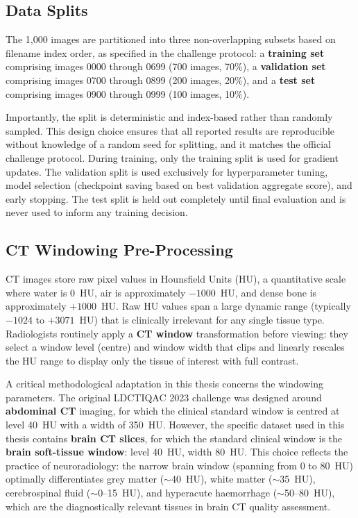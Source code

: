 \subsection{Data Splits}

The 1,000 images are partitioned into three non-overlapping subsets based on filename
index order, as specified in the challenge protocol: a \textbf{training set} comprising
images 0000 through 0699 (700 images, 70\%), a \textbf{validation set} comprising images
0700 through 0899 (200 images, 20\%), and a \textbf{test set} comprising images 0900
through 0999 (100 images, 10\%).

Importantly, the split is deterministic and index-based rather than randomly sampled.
This design choice ensures that all reported results are reproducible without knowledge
of a random seed for splitting, and it matches the official challenge protocol. During
training, only the training split is used for gradient updates. The validation split is
used exclusively for hyperparameter tuning, model selection (checkpoint saving based on
best validation aggregate score), and early stopping. The test split is held out
completely until final evaluation and is never used to inform any training decision.

\subsection{CT Windowing Pre-Processing}
\label{subsec:windowing}

CT images store raw pixel values in Hounsfield Units (HU), a quantitative scale where
water is 0~HU, air is approximately $-1000$~HU, and dense bone is approximately
$+1000$~HU. Raw HU values span a large dynamic range (typically $-1024$ to $+3071$~HU)
that is clinically irrelevant for any single tissue type. Radiologists routinely apply a
\textbf{CT window} transformation before viewing: they select a window level (centre)
and window width that clips and linearly rescales the HU range to display only the tissue
of interest with full contrast.

A critical methodological adaptation in this thesis concerns the windowing parameters.
The original LDCTIQAC 2023 challenge was designed around \textbf{abdominal CT} imaging,
for which the clinical standard window is centred at level 40~HU with a width of
350~HU. However, the specific dataset used in this thesis contains \textbf{brain CT
slices}, for which the standard clinical window is the \textbf{brain soft-tissue window}:
level 40~HU, width 80~HU. This choice reflects the practice of neuroradiology: the
narrow brain window (spanning from 0 to 80~HU) optimally differentiates grey matter
($\sim$40~HU), white matter ($\sim$35~HU), cerebrospinal fluid ($\sim$0--15~HU), and
hyperacute haemorrhage ($\sim$50--80~HU), which are the diagnostically relevant tissues
in brain CT quality assessment.

